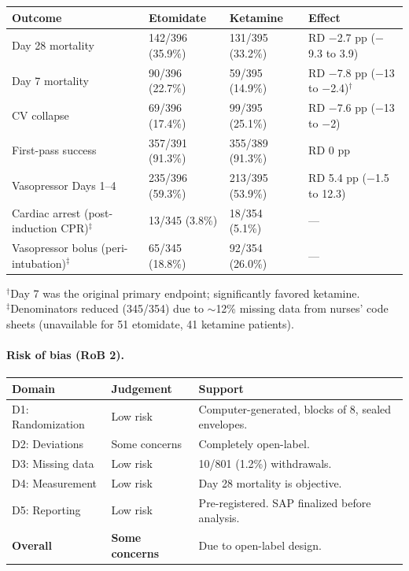 \documentclass[11pt]{article}
\begin{document}
\begin{table}[H]
\centering\footnotesize
\begin{tabularx}{\textwidth}{L{4cm} C{2.5cm} C{2.5cm} X}
\toprule
\textbf{Outcome} & \textbf{Etomidate} & \textbf{Ketamine} & \textbf{Effect} \\
\midrule
Day 28 mortality & 142/396 (35.9\%) & 131/395 (33.2\%) & RD $-$2.7 pp ($-$9.3 to 3.9) \\
Day 7 mortality & 90/396 (22.7\%) & 59/395 (14.9\%) & RD $-$7.8 pp ($-$13 to $-$2.4)$^{\dag}$ \\
CV collapse & 69/396 (17.4\%) & 99/395 (25.1\%) & RD $-$7.6 pp ($-$13 to $-$2) \\
First-pass success & 357/391 (91.3\%) & 355/389 (91.3\%) & RD 0 pp \\
Vasopressor Days 1--4 & 235/396 (59.3\%) & 213/395 (53.9\%) & RD 5.4 pp ($-$1.5 to 12.3) \\
Cardiac arrest (post-induction CPR)$^{\ddag}$ & 13/345 (3.8\%) & 18/354 (5.1\%) & --- \\
Vasopressor bolus (peri-intubation)$^{\ddag}$ & 65/345 (18.8\%) & 92/354 (26.0\%) & --- \\
\bottomrule
\end{tabularx}
\vspace{2pt}\raggedright\footnotesize $^{\dag}$Day 7 was the original primary endpoint; significantly favored ketamine.\\
$^{\ddag}$Denominators reduced (345/354) due to $\sim$12\% missing data from nurses' code sheets (unavailable for 51 etomidate, 41 ketamine patients).
\end{table}

\paragraph{Risk of bias (RoB 2).}

\begin{table}[H]
\centering\footnotesize
\begin{tabularx}{\textwidth}{L{3cm} C{2cm} X}
\toprule
\textbf{Domain} & \textbf{Judgement} & \textbf{Support} \\
\midrule
D1: Randomization & Low risk & Computer-generated, blocks of 8, sealed envelopes. \\
D2: Deviations & Some concerns & Completely open-label. \\
D3: Missing data & Low risk & 10/801 (1.2\%) withdrawals. \\
D4: Measurement & Low risk & Day 28 mortality is objective. \\
D5: Reporting & Low risk & Pre-registered. SAP finalized before analysis. \\
\textbf{Overall} & \textbf{Some concerns} & Due to open-label design. \\
\bottomrule
\end{tabularx}
\end{table}
\end{document}
